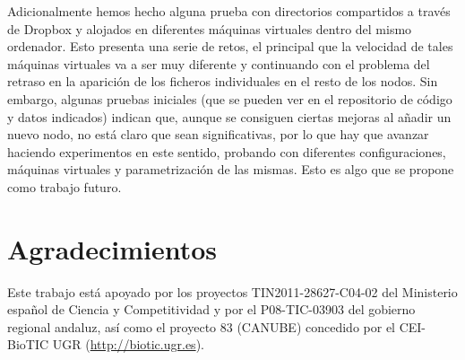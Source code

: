 \documentclass{article}
\begin{document}
Adicionalmente hemos hecho alguna prueba con directorios compartidos a
través de Dropbox y alojados en diferentes máquinas virtuales dentro
del mismo ordenador. 
Esto presenta una serie de retos, el principal   %
que la velocidad de tales máquinas virtuales va a ser muy diferente y
continuando con el problema del retraso en la aparición de los
ficheros individuales en el resto de los nodos. 
Sin embargo, algunas pruebas iniciales (que se pueden ver en el repositorio de código y
datos indicados) indican que, aunque se consiguen ciertas mejoras al
añadir un nuevo nodo, no está claro que sean significativas, por lo
que hay que avanzar haciendo experimentos en este sentido, probando
con diferentes configuraciones, máquinas virtuales y parametrización
de las mismas. Esto es algo que se propone como trabajo futuro.




\section{Agradecimientos}
Este trabajo está apoyado por los proyectos 
TIN2011-28627-C04-02 del Ministerio español de Ciencia y
Competitividad y por el P08-TIC-03903 del gobierno regional andaluz,
así como el proyecto 83 (CANUBE) concedido por el CEI-BioTIC UGR
(\url{http://biotic.ugr.es}). 



\end{document}
